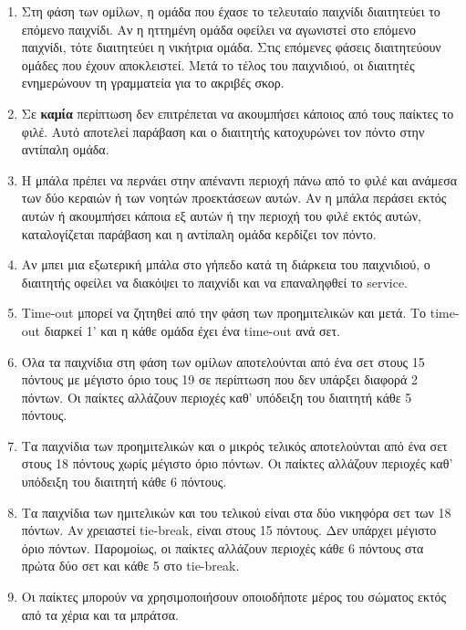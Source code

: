 \documentclass[a4paper,11pt]{article}
\begin{document}
\begin{enumerate}
\item Στη φάση των ομίλων, η ομάδα που έχασε το τελευταίο παιχνίδι διαιτητεύει
  το επόμενο παιχνίδι. Αν η ηττημένη ομάδα οφείλει να αγωνιστεί στο επόμενο
  παιχνίδι, τότε διαιτητεύει η νικήτρια ομάδα. Στις επόμενες φάσεις διαιτητεύουν
  ομάδες που έχουν αποκλειστεί. Μετά το τέλος του παιχνιδιού, οι διαιτητές
  ενημερώνουν τη γραμματεία για το ακριβές σκορ.

\item Σε \textbf{καμία} περίπτωση δεν επιτρέπεται να ακουμπήσει κάποιος από τους
  παίκτες το φιλέ. Αυτό αποτελεί παράβαση και ο διαιτητής κατοχυρώνει τον πόντο
  στην αντίπαλη ομάδα.

\item Η μπάλα πρέπει να περνάει στην απέναντι περιοχή πάνω από το φιλέ και
  ανάμεσα των δύο κεραιών ή των νοητών προεκτάσεων αυτών. Αν η μπάλα περάσει
  εκτός αυτών ή ακουμπήσει κάποια εξ αυτών ή την περιοχή του φιλέ εκτός αυτών,
  καταλογίζεται παράβαση και η αντίπαλη ομάδα κερδίζει τον πόντο.

\item Αν μπει μια εξωτερική μπάλα στο γήπεδο κατά τη διάρκεια του παιχνιδιού, ο
  διαιτητής οφείλει να διακόψει το παιχνίδι και να επαναληφθεί το service.

\item Time-out μπορεί να ζητηθεί από την φάση των προημιτελικών και μετά. Το
  time-out διαρκεί 1' και η κάθε ομάδα έχει ένα time-out ανά σετ.

\item Όλα τα παιχνίδια στη φάση των ομίλων αποτελούνται από ένα σετ στους 15
  πόντους με μέγιστο όριο τους 19 σε περίπτωση που δεν υπάρξει διαφορά 2 πόντων.
  Οι παίκτες αλλάζουν περιοχές καθ' υπόδειξη του διαιτητή κάθε 5 πόντους.

\item Τα παιχνίδια των προημιτελικών και ο μικρός τελικός αποτελούνται από ένα
  σετ στους 18 πόντους χωρίς μέγιστο όριο πόντων. Οι παίκτες αλλάζουν περιοχές
  καθ' υπόδειξη του διαιτητή κάθε 6 πόντους.

\item Τα παιχνίδια των ημιτελικών και του τελικού είναι στα δύο νικηφόρα σετ των
  18 πόντων. Αν χρειαστεί tie-break, είναι στους 15 πόντους. Δεν υπάρχει μέγιστο
  όριο πόντων. Παρομοίως, οι παίκτες αλλάζουν περιοχές κάθε 6 πόντους στα πρώτα
  δύο σετ και κάθε 5 στο tie-break.

\item Οι παίκτες μπορούν να χρησιμοποιήσουν οποιοδήποτε μέρος του σώματος εκτός
  από τα χέρια και τα μπράτσα.


\end{enumerate}
\end{document}
